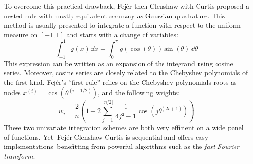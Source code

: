 To overcome this practical drawback, Fejér then Clenshaw with Curtis proposed a nested rule with mostly equivalent accuracy as Gaussian quadrature.
This method is usually presented to integrate a function with respect to the uniform measure on $[-1, 1]$ and starts with a change of variables:
\begin{equation}
    \int_{-1}^{1} g(x) \, \dd x = \int_{0}^{\pi} g(\cos(\theta)) \sin(\theta) \, \dd \theta 
\end{equation}
This expression can be written as an expansion of the integrand using cosine series. 
Moreover, cosine series are closely related to the Chebyshev polynomials of the first kind. 
Fejér's ``first rule'' \citep{trefethen_2008} relies on the Chebyshev polynomials roots as nodes $x^{(i)} = \cos(\theta^{(i+1/2)})$, and the following weights:
\begin{equation}
    w_i=\frac{2}{n}\left(1-2\sum_{j=1}^{\lfloor n/2 \rfloor}\frac{1}{4j^2-1}\cos\left(j\theta^{(2i+1)}\right)\right)    
\end{equation}
These two univariate integration schemes are both very efficient on a wide panel of functions. 
Yet, Fejér-Clenshaw-Curtis is sequential and offers easy implementations, benefitting from powerful algorithms such as the \textit{fast Fourier transform}. 

